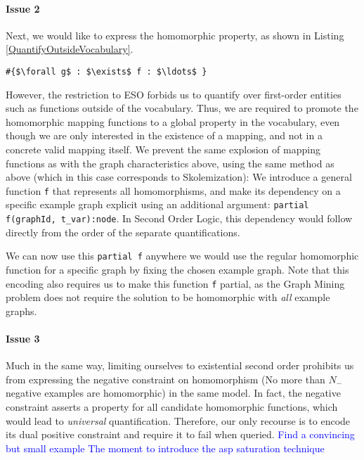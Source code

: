 \documentclass{article}
\theoremstyle{definition}
\newcommand{\matthias}[1]{\textcolor{blue}{\marginpar{\sc Matthias} #1}}
\begin{document}
\paragraph{Issue 2}
Next, we would like to express the homomorphic property, as shown in Listing \ref{QuantifyOutsideVocabulary}.
\begin{lstlisting}[mathescape, caption=Quantifying over functions outside the vocabulary, label=QuantifyOutsideVocabulary,basicstyle=\fontfamily{lmvtt}\selectfont]
#{$\forall g$ : $\exists$ f : $\ldots$ }
\end{lstlisting}
However, the restriction to ESO forbids us to quantify over first-order entities such as functions outside of the vocabulary.
Thus, we are required to promote the homomorphic mapping functions to a global property in the vocabulary, even though we are only interested in the existence of a mapping, and not in a concrete valid mapping itself.
We prevent the same explosion of mapping functions as with the graph characteristics above, using the same method as above (which in this case corresponds to Skolemization):
We introduce a general function \verb|f| that represents all homomorphisms, and make its dependency on a specific example graph explicit using an additional argument:
\verb|partial f(graphId, t_var):node|.
In Second Order Logic, this dependency would follow directly from the order of the separate quantifications.

We can now use this \verb|partial f| anywhere we would use the regular homomorphic function for a specific graph by fixing the chosen example graph.
Note that this encoding also requires us to make this function \verb|f| partial, as the Graph Mining problem does not require the solution to be homomorphic with \emph{all} example graphs.


\paragraph{Issue 3} Much in the same way, limiting ourselves to existential second order prohibits us from expressing the negative constraint on homomorphism (No more than $N_{-}$ negative examples are homomorphic) in the same model.
In fact, the negative constraint asserts a property for all candidate homomorphic functions, which would lead to \emph{universal} quantification.
Therefore, our only recourse is to encode its dual positive constraint and require it to fail when queried.\matthias{Find a convincing but small example}
\matthias{The moment to introduce the asp saturation technique}
\end{document}
